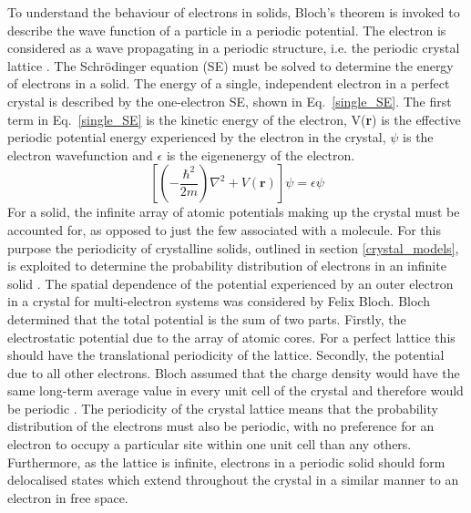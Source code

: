 \documentclass[11pt, twoside]{report}
\begin{document}
To understand the behaviour of electrons in solids, Bloch's theorem is invoked to describe the wave function of a particle in a periodic potential. The electron is considered as a wave propagating in a periodic structure, i.e. the periodic crystal lattice \cite{small_semiconductor1}. The Schr{\"o}dinger equation (SE) must be solved to determine the energy of electrons in a solid. 
The energy of a single, independent electron in a perfect crystal is described by the one-electron SE, shown in Eq.~\ref{single_SE}. The first term in Eq.~\ref{single_SE} is the kinetic energy of the electron, V(\textbf{r}) is the effective periodic potential energy experienced by the electron in the crystal, $\psi$ is the electron wavefunction and $\epsilon$ is the eigenenergy of the electron.
\begin{equation} \label{single_SE}
\left[ \left(-\frac{\hbar^2}{2m}\right)\nabla^2 + V(\mathbf{r})\right]\psi = \epsilon \psi 
\end{equation}
For a solid, the infinite array of atomic potentials making up the crystal must be accounted for, as opposed to just the few associated with a molecule. For this purpose the periodicity of crystalline solids, outlined in section \ref{crystal_models}, is exploited to determine the probability distribution of electrons in an infinite solid \cite{Nelson3}. 
The spatial dependence of the potential experienced by an outer electron in a crystal for multi-electron systems was considered by Felix Bloch. Bloch determined that the total potential is the sum of two parts. Firstly, the electrostatic potential due to the array of atomic cores. For a perfect lattice this should have the translational periodicity of the lattice. Secondly, the potential due to all other electrons. Bloch assumed that the charge density would have the same long-term average value in every unit cell of the crystal and therefore would be periodic \cite{fund_semi}.
The periodicity of the crystal lattice means that the probability distribution of the electrons must also be periodic, with no preference for an electron to occupy a particular site within one unit cell than any others. Furthermore, as the lattice is infinite, electrons in a periodic solid should form delocalised states which extend throughout the crystal in a similar manner to an electron in free space.

\end{document}
